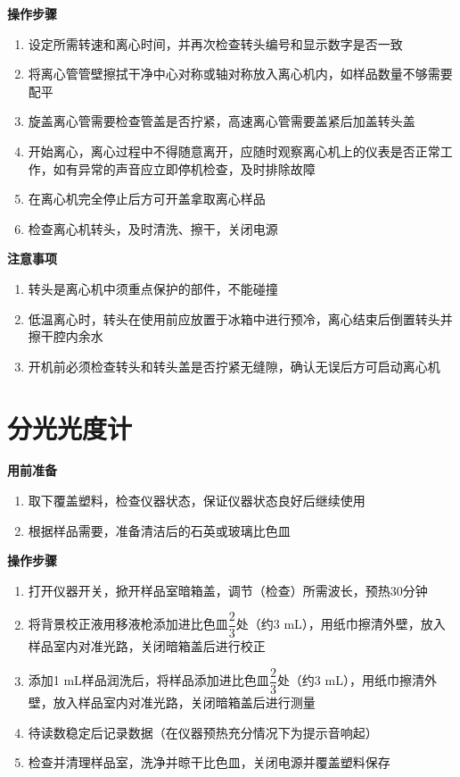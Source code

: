 \documentclass[
]{book}
\providecommand{\tightlist}{%
  \setlength{\itemsep}{0pt}\setlength{\parskip}{0pt}}
\begin{document}
\textbf{操作步骤}

\begin{enumerate}
\def\labelenumi{\arabic{enumi}.}
\tightlist
\item
  设定所需转速和离心时间，并再次检查转头编号和显示数字是否一致
\item
  将离心管管壁擦拭干净中心对称或轴对称放入离心机内，如样品数量不够需要配平
\item
  旋盖离心管需要检查管盖是否拧紧，高速离心管需要盖紧后加盖转头盖
\item
  开始离心，离心过程中不得随意离开，应随时观察离心机上的仪表是否正常工作，如有异常的声音应立即停机检查，及时排除故障
\item
  在离心机完全停止后方可开盖拿取离心样品
\item
  检查离心机转头，及时清洗、擦干，关闭电源
\end{enumerate}

\textbf{注意事项}

\begin{enumerate}
\def\labelenumi{\arabic{enumi}.}
\tightlist
\item
  转头是离心机中须重点保护的部件，不能碰撞
\item
  低温离心时，转头在使用前应放置于冰箱中进行预冷，离心结束后倒置转头并擦干腔内余水
\item
  开机前必须检查转头和转头盖是否拧紧无缝隙，确认无误后方可启动离心机
\end{enumerate}

\hypertarget{ux5206ux5149ux5149ux5ea6ux8ba1}{%
\section{分光光度计}\label{ux5206ux5149ux5149ux5ea6ux8ba1}}

\textbf{用前准备}

\begin{enumerate}
\def\labelenumi{\arabic{enumi}.}
\tightlist
\item
  取下覆盖塑料，检查仪器状态，保证仪器状态良好后继续使用
\item
  根据样品需要，准备清洁后的石英或玻璃比色皿
\end{enumerate}

\textbf{操作步骤}

\begin{enumerate}
\def\labelenumi{\arabic{enumi}.}
\tightlist
\item
  打开仪器开关，掀开样品室暗箱盖，调节（检查）所需波长，预热30分钟
\item
  将背景校正液用移液枪添加进比色皿\(\dfrac{2}{3}\)处（约3
  mL），用纸巾擦清外壁，放入样品室内对准光路，关闭暗箱盖后进行校正
\item
  添加1 mL样品润洗后，将样品添加进比色皿\(\dfrac{2}{3}\)处（约3
  mL），用纸巾擦清外壁，放入样品室内对准光路，关闭暗箱盖后进行测量
\item
  待读数稳定后记录数据（在仪器预热充分情况下为提示音响起）
\item
  检查并清理样品室，洗净并晾干比色皿，关闭电源并覆盖塑料保存
\end{enumerate}
\end{document}
